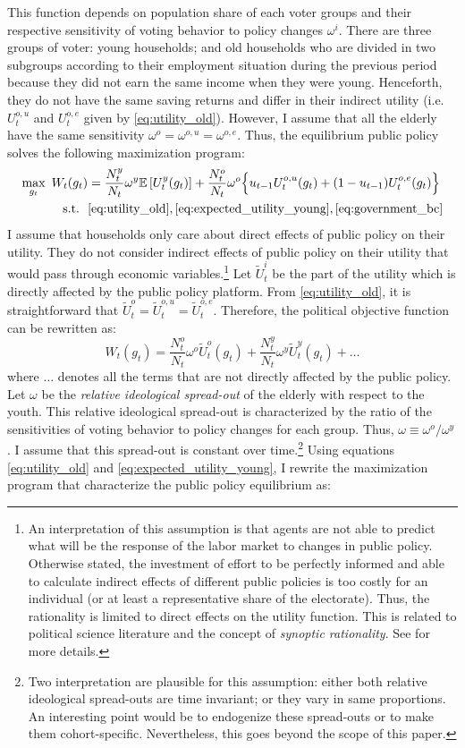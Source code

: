 This function depends on population share of each voter groups and their respective sensitivity of voting behavior to policy changes $\omega^i$. There are three groups of voter: young households; and old households who are divided in two subgroups according to their employment situation during the previous period because they did not earn the same income when they were young. Henceforth, they do not have the same saving returns and differ in their indirect utility (i.e. $U_t^{o,u}$ and $U_t^{o,e}$ given by \eqref{eq:utility_old}). However, I assume that all the elderly have the same sensitivity $\omega^o = \omega^{o,u} = \omega^{o,e}$. Thus, the equilibrium public policy solves the following maximization program:
	\begin{align*}
		\max_{g_t} ~ W_t(g_t) &= \frac{N_t^y}{N_t} \omega^y \mathbb{E}\left[U_t^y(g_t)\right] + \frac{N_t^o}{N_t} \omega^o \Big\{ u_{t-1} U_t^{o,u}(g_t) + (1-u_{t-1}) U_t^{o,e}(g_t) \Big\} \\
		\text{s.t.} ~~ & \eqref{eq:utility_old}, \eqref{eq:expected_utility_young}, \eqref{eq:government_bc}
	\end{align*}
I assume that households only care about direct effects of public policy on their utility. They do not consider indirect effects of public policy on their utility that would pass through economic variables.\footnote{An interpretation of this assumption is that agents are not able to predict what will be the response of the labor market to changes in public policy. Otherwise stated, the investment of effort to be perfectly informed and able to calculate indirect effects of different public policies is too costly for an individual (or at least a representative share of the electorate). Thus, the rationality is limited to direct effects on the utility function. This is related to political science literature and the concept of \textit{synoptic rationality}. See \cite{Meier1980} for more details.} Let $\tilde{U}^i_t$ be the part of the utility which is directly affected by the public policy platform. From \eqref{eq:utility_old}, it is straightforward that $\tilde{U}_t^o = \tilde{U}_t^{o,u} = \tilde{U}_t^{o,e}$. Therefore, the political objective function can be rewritten as:
	\begin{equation*}
		W_t(g_t) = \frac{N_t^o}{N_t} \omega^o \tilde{U}_t^o(g_t) + \frac{N_t^y}{N_t} \omega^y \tilde{U}_t^y(g_t) + \dots
	\end{equation*}
where $\dots$ denotes all the terms that are not directly affected by the public policy. Let $\omega$ be the \textit{relative ideological spread-out} of the elderly with respect to the youth. This relative ideological spread-out is characterized by the ratio of the sensitivities of voting behavior to policy changes for each group. Thus, $\omega \equiv \omega^o/\omega^y$. I assume that this spread-out is constant over time.\footnote{Two interpretation are plausible for this assumption: either both relative ideological spread-outs are time invariant; or they vary in same proportions. An interesting point would be to endogenize these spread-outs or to make them cohort-specific. Nevertheless, this goes beyond the scope of this paper.} Using equations \eqref{eq:utility_old} and \eqref{eq:expected_utility_young}, I rewrite the maximization program that characterize the public policy equilibrium as:
